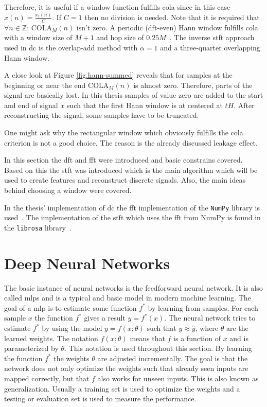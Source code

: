 Therefore, it is useful if a window function fulfills \gls{cola} since in this case $x(n)=\frac{x_t(n)}{C}$. If $C=1$ then no division is needed.
Note that it is required that $\forall n \in \mathbb{Z}$: $\mathrm{COLA}_M(n)$ isn't zero.
A periodic (\gls{dft}-even) Hann window fulfills \gls{cola} with a window size of $M+1$ and hop size of $0.25M$~\cite[p.~859]{Oppenheim2014}.
The inverse \gls{stft} approach used in \gls{dc} is the overlap-add method with $\alpha=1$ and a three-quarter overlapping Hann window.

A close look at Figure \ref{fig.hann-summed} reveals that for samples at the beginning or near the end $\mathrm{COLA}_M(n)$ is almost zero. Therefore, parts of the signal are basically lost. In this thesis samples of value zero are added to the start and end of signal $x$ such that the first Hann window is at centered at $tH$. After reconstructing the signal, some samples have to be truncated.

One might ask why the rectangular window which obviously fulfills the \gls{cola} criterion is not a good choice. The reason is the already discussed leakage effect.

In this section the \gls{dft} and \gls{fft} were introduced and basic constrains covered. Based on this the \gls{stft} was introduced which is the main algorithm which will be used to create features and reconstruct discrete signals. Also, the main ideas behind choosing a window were covered.

In the thesis' implementation of \gls{dc} the \gls{fft} implementation of the \texttt{NumPy} library is used~\cite{Oliphant2006}. The implementation of the \gls{stft} which uses the \gls{fft} from NumPy is found in the \texttt{librosa} library~\cite{McFee2019}.

\section{Deep Neural Networks}\label{sec.foundations-dnn}

The basic instance of neural networks is the feedforward neural network. It is also called \glspl{mlp} and is a typical and basic model in modern machine learning. The goal of a \gls{mlp} is to estimate some function $f^{*}$ by learning from samples. For each sample $x$ the function $f^{*}$ gives a result $\hat{y}=f^{*}(x)$. The neural network tries to estimate $f^{*}$ by using the model $y=f(x;\theta)$ such that $y \approx \hat{y}$, where $\theta$ are the learned weights. The notation $f(x;\theta)$ means that $f$ is a function of $x$ and is parameterized by $\theta$. This notation is used throughout this section.
By learning the function $f^{*}$ the weights $\theta$ are adjusted incrementally. The goal is that the network does not only optimize the weights such that already seen inputs are mapped correctly, but that $f$ also works for unseen inputs. This is also known as generalization.
Usually a training set is used to optimize the weights and a testing or evaluation set is used to measure the performance. \cite[p.~102]{Goodfellow2016}

